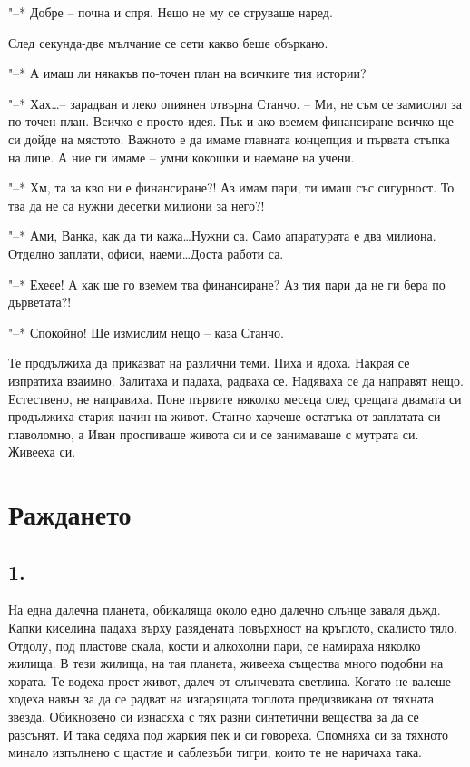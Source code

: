 \documentclass[ebook,openany,12pt]{memoir}
\begin{document}
"--* Добре – почна и спря. Нещо не му се струваше наред.

След секунда-две мълчание се сети какво беше объркано.

"--* А имаш ли някакъв по-точен план на всичките тия истории?

"--* Хах\ldots – зарадван и леко опиянен отвърна Станчо. – Ми, не съм се замислял за по-точен план. Всичко е просто идея. Пък и ако вземем финансиране всичко ще си дойде на мястото. Важното е да имаме главната концепция и първата стъпка на лице. А ние ги имаме – умни кокошки и наемане на учени.

"--* Хм, та за кво ни е финансиране?! Аз имам пари, ти имаш със сигурност. То тва да не са нужни десетки милиони за него?!

"--* Ами, Ванка, как да ти кажа\ldots Нужни са. Само апаратурата е два милиона. Отделно заплати, офиси, наеми\ldots Доста работи са.

"--* Ехеее! А как ше го вземем тва финансиране? Аз тия пари да не ги бера по дърветата?!

"--* Спокойно! Ще измислим нещо – каза Станчо.

Те продължиха да приказват на различни теми. Пиха и ядоха. Накрая се изпратиха взаимно. Залитаха и падаха, радваха се. Надяваха се да направят нещо. Естествено, не направиха. Поне първите няколко месеца след срещата двамата си продължиха стария начин на живот. Станчо харчеше остатъка от заплатата си главоломно, а Иван проспиваше живота си и се занимаваше с мутрата си. Живееха си.

\chapter{Раждането}

\section*{1.}

На една далечна планета, обикаляща около едно далечно слънце заваля дъжд. Капки киселина падаха върху разядената повърхност на кръглото, скалисто тяло. Отдолу, под пластове скала, кости и алкохолни пари, се намираха няколко жилища. В тези жилища, на тая планета, живееха същества много подобни на хората. Те водеха прост живот, далеч от слънчевата светлина. Когато не валеше ходеха навън за да се радват на изгарящата топлота предизвикана от тяхната звезда. Обикновено си изнасяха с тях разни синтетични вещества за да се разсънят. И така седяха под жаркия пек и си говореха. Спомняха си за тяхното минало изпълнено с щастие и саблезъби тигри, които те не наричаха така. 
\end{document}
